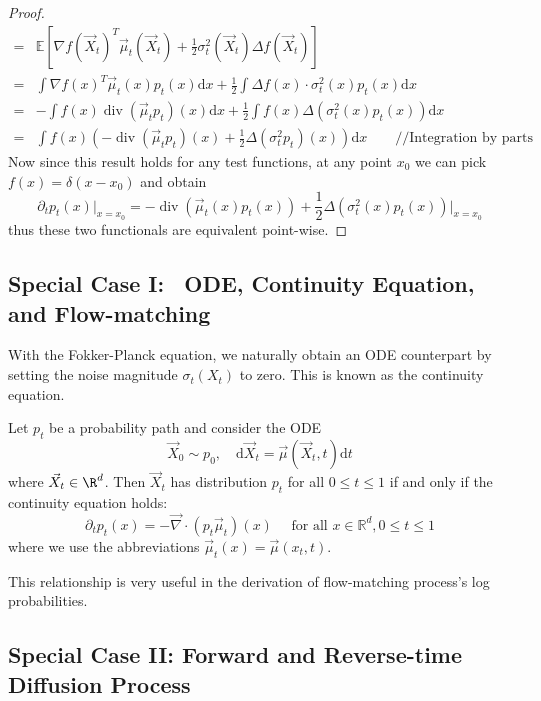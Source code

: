\documentclass{article}
\begin{document}
\begin{proof}
$$\begin{aligned}
= & \mathbb{E}\left[\nabla f\left(\vec{X}_t\right)^T {\vec{\mu}_t}\left(\vec{X}_t\right)+\frac{1}{2} \sigma_t^2 (\vec{X}_t)\Delta f\left(\vec{X}_t\right)\right] \\
=& \int \nabla f(x)^T {\vec{\mu}_t}(x) p_t(x) \mathrm{d} x+\frac{1}{2}\int \Delta f(x)  \cdot \sigma_t^2(x)  p_t(x) \mathrm{d} x \\
{=} & -\int f(x) \operatorname{div}\left({\vec{\mu}_t} p_t\right)(x) \mathrm{d} x+\frac{1}{2} \int f(x) \Delta \left(\sigma_t^2(x) p_t(x)\right) \mathrm{d} x \\
= & \int f(x)\left(-\operatorname{div}\left({\vec{\mu}_t} p_t\right)(x)+\frac{1}{2}\Delta \left(\sigma_t^2p_t\right)\left(x\right)\right) \mathrm{d} x \qquad // \text{Integration by parts} 
\end{aligned}
$$
Now since this result holds for any test functions, at any point $x_0$ we can pick $f(x)=\delta(x-x_0)$ and obtain
$$
\partial_t p_t(x) \bigg|_{x=x_0} =
-\operatorname{div}\left({\vec{\mu}_t}(x) p_t(x)\right)+\frac{1}{2}\Delta \left(\sigma_t^2 (x)p_t\left(x\right)\right)
\bigg|_{x=x_0}
$$ thus these two functionals are equivalent point-wise. 

\end{proof}



\subsection{Special Case I: \ ODE, Continuity Equation, and Flow-matching}

With the Fokker-Planck equation, we naturally obtain an ODE counterpart by setting the noise magnitude $\sigma_t(X_t)$ to zero. This is known as the continuity equation. 
\begin{corollary}
Let $p_t$ be a probability path and consider the ODE
$$
\vec{X}_0 \sim p_0, \quad \mathrm{d} \vec{X}_t=\vec{\mu} \left(\vec{X}_t, t\right) \mathrm{d} t
$$
where $\vec{X}_t\in \R^{d}$. Then $\vec{X}_t$ has distribution $p_t$ for all $0 \leq t \leq 1$ if and only if the continuity equation holds:
$$
\partial_t p_t(x)=-\vec{\nabla} \cdot \left(p_t {\vec{\mu}_t}\right)(x)\quad \text { for all } x \in \mathbb{R}^d, 0 \leq t \leq 1
$$
where we use the abbreviations ${\vec{\mu}_t}(x)=\vec{\mu}(x_t,t)$. 
\end{corollary}
This relationship is very useful in the derivation of flow-matching process's log probabilities. 


\subsection{Special Case II: Forward and Reverse-time Diffusion Process}
\end{document}
